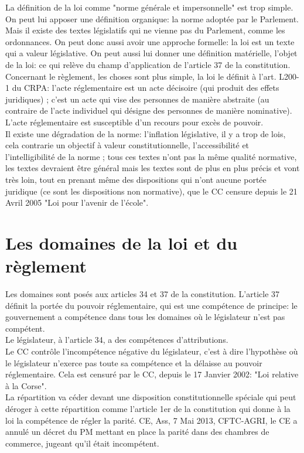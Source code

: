 \documentclass[10pt, a4paper, openany]{book}
\begin{document}
La définition de la loi comme "norme générale et impersonnelle" est trop simple. On peut lui apposer une définition organique: la norme adoptée par le Parlement. Mais il existe des textes législatifs qui ne vienne pas du Parlement, comme les ordonnances. On peut donc aussi avoir une approche formelle: la loi est un texte qui a valeur législative. On peut aussi lui donner une définition matérielle, l'objet de la loi: ce qui relève du champ d'application de l'article 37 de la constitution. \\
Concernant le règlement, les choses sont plus simple, la loi le définit à l'art. L200-1 du CRPA: l'acte réglementaire est un acte décisoire (qui produit des effets juridiques) ; c'est un acte qui vise des personnes de manière abstraite (au contraire de l'acte individuel qui désigne des personnes de manière nominative). L'acte réglementaire est susceptible d'un recours pour excès de pouvoir. \\
Il existe une dégradation de la norme: l'inflation législative, il y a trop de lois, cela contrarie un objectif à valeur constitutionnelle, l'accessibilité et l'intelligibilité de la norme ; tous ces textes n'ont pas la même qualité normative, les textes devraient être général mais les textes sont de plus en plus précis et vont très loin, tout en prenant même des dispositions qui n'ont aucune portée juridique (ce sont les dispositions non normative), que le CC censure depuis le 21 Avril 2005 "Loi pour l'avenir de l'école".

\section{Les domaines de la loi et du règlement}

Les domaines sont posés aux articles 34 et 37 de la constitution. L'article 37 définit la portée du pouvoir réglementaire, qui est une compétence de principe: le gouvernement a compétence dans tous les domaines où le législateur n'est pas compétent. \\
Le législateur, à l'article 34, a des compétences d'attributions. \\
Le CC contrôle l'incompétence négative du législateur, c'est à dire l'hypothèse où le législateur n'exerce pas toute sa compétence et la délaisse au pouvoir réglementaire. Cela est censuré par le CC, depuis le 17 Janvier 2002: "Loi relative à la Corse". \\
La répartition va céder devant une disposition constitutionnelle spéciale qui peut déroger à cette répartition comme l'article 1er de la constitution qui donne à la loi la compétence de régler la parité. CE, Ass, 7 Mai 2013, CFTC-AGRI, le CE a annulé un décret du PM mettant en place la parité dans des chambres de commerce, jugeant qu'il était incompétent.  
\end{document}
